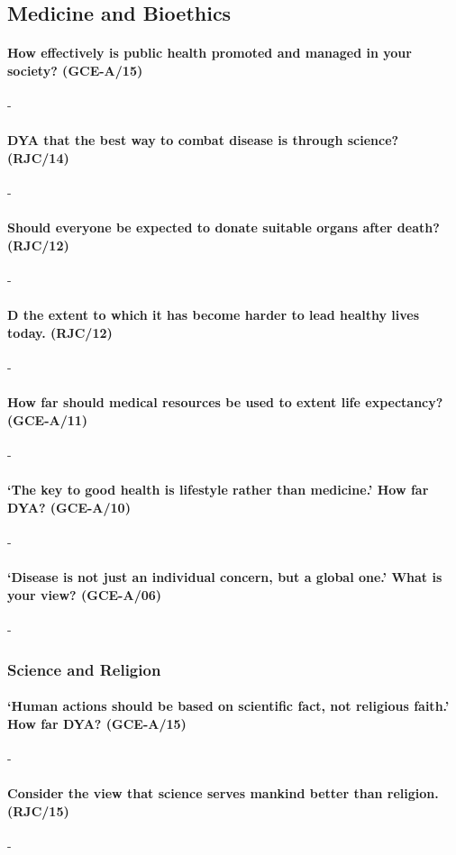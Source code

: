 \documentclass[../../main]{subfiles}
\begin{document}
\subsection{Medicine and Bioethics}

\paragraph{How effectively is public health promoted and managed in your society? (GCE-A/15)}-

\paragraph{DYA that the best way to combat disease is through science? (RJC/14)}-

\paragraph{Should everyone be expected to donate suitable organs after death? (RJC/12)}-

\paragraph{D the extent to which it has become harder to lead healthy lives today. (RJC/12)}-

\paragraph{How far should medical resources be used to extent life expectancy? (GCE-A/11)}-

\paragraph{`The key to good health is lifestyle rather than medicine.' How far DYA? (GCE-A/10)}-

\paragraph{`Disease is not just an individual concern, but a global one.' What is your view? (GCE-A/06)}-


\subsubsection{Science and Religion}

\paragraph{`Human actions should be based on scientific fact, not religious faith.' How far DYA? (GCE-A/15)}-

\paragraph{Consider the view that science serves mankind better than religion. (RJC/15)}-
\end{document}
